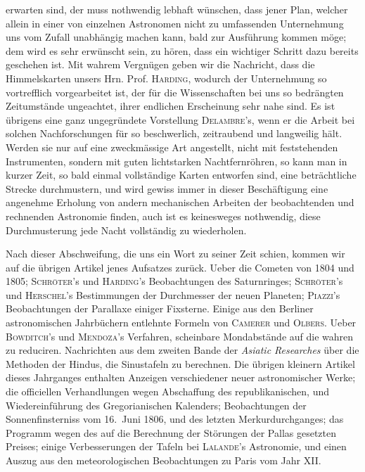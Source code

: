 erwarten sind, der muss nothwendig lebhaft wünschen, dass jener Plan, welcher allein in einer von einzelnen Astronomen nicht zu umfassenden Unternehmung uns vom Zufall unabhängig machen kann, bald zur Ausführung kommen möge; dem wird es sehr erwünscht sein, zu hören, dass ein wichtiger Schritt dazu bereits geschehen ist. Mit wahrem Vergnügen geben wir die Nachricht, dass die Himmelskarten unsers Hrn. Prof. \textsc{Harding}, wodurch der Unternehmung so vortrefflich vorgearbeitet ist, der für die Wissenschaften bei uns so bedrängten Zeitumstände ungeachtet, ihrer endlichen Erscheinung sehr nahe sind. Es ist übrigens eine ganz ungegründete Vorstellung \textsc{Delambre}'s, wenn er die Arbeit bei solchen Nachforschungen für so beschwerlich, zeitraubend und langweilig hält. Werden sie nur auf eine zweckmässige Art angestellt, nicht mit feststehenden Instrumenten, sondern mit guten lichtstarken Nachtfernröhren, so kann man in kurzer Zeit, so bald einmal vollständige Karten entworfen sind, eine beträchtliche Strecke durchmustern, und wird gewiss immer in dieser Beschäftigung eine angenehme Erholung von andern mechanischen Arbeiten der beobachtenden und rechnenden Astronomie finden, auch ist es keinesweges nothwendig, diese Durchmusterung jede Nacht vollständig zu wiederholen.

Nach dieser Abschweifung, die uns ein Wort zu seiner Zeit schien, kommen wir auf die übrigen Artikel jenes Aufsatzes zurück. Ueber die Cometen von 1804 und 1805; \textsc{Schröter}'s und \textsc{Harding}'s
 Beobachtungen des Saturnringes; \textsc{Schröter}'s und \textsc{Herschel}'s Bestimmungen der Durchmesser der neuen Planeten; \textsc{Piazzi}'s Beobachtungen der Parallaxe einiger Fixsterne. Einige aus den Berliner astronomischen Jahrbüchern entlehnte Formeln von \textsc{Camerer} und \textsc{Olbers}. Ueber \textsc{Bowditch}'s und \textsc{Mendoza}'s Verfahren, scheinbare Mondabstände auf die wahren zu reduciren. Nachrichten aus dem zweiten Bande der \emph{Asiatic Researches} über die Methoden der Hindus, die Sinustafeln zu berechnen. Die übrigen kleinern Artikel dieses Jahrganges enthalten Anzeigen verschiedener neuer astronomischer Werke; die officiellen Verhandlungen wegen Abschaffung des republikanischen, und Wiedereinführung des Gregorianischen Kalenders; Beobachtungen der Sonnenfinsterniss vom 16.\ Juni 1806, und des letzten Merkurdurchganges; das Programm wegen des auf die Berechnung der Störungen der Pallas gesetzten Preises; einige Verbesserungen der Tafeln bei \textsc{Lalande}'s Astronomie, und einen Auszug aus den meteorologischen Beobachtungen zu Paris vom Jahr XII.

